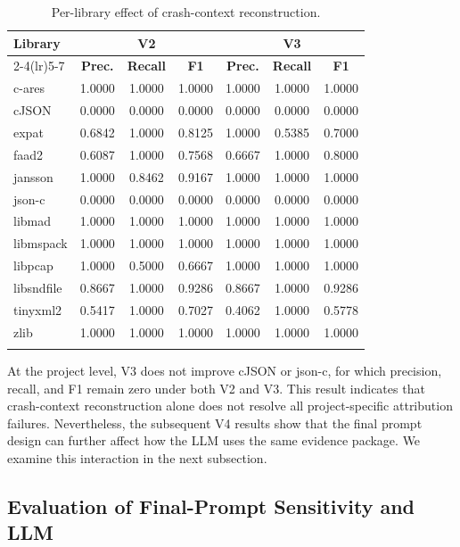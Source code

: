 \documentclass[pdflatex,sn-basic]{sn-jnl}%
\renewcommand{\arraystretch}{1.16}%
\theoremstyle{thmstyleone}%
\theoremstyle{thmstyletwo}%
\theoremstyle{thmstylethree}%
\begin{document}
\begin{table}[!htbp]
\caption{Per-library effect of crash-context reconstruction.}
\label{tab:per-library-context-reconstruction}
\centering
\scriptsize
\setlength{\tabcolsep}{2.2pt}
\renewcommand{\arraystretch}{1.08}
\begin{tabular*}{\linewidth}{@{\extracolsep{\fill}}lcccccc}
\toprule
\textbf{Library} & \multicolumn{3}{c}{\textbf{V2}} & \multicolumn{3}{c}{\textbf{V3}} \\
\cmidrule(lr){2-4}\cmidrule(lr){5-7}
& \textbf{Prec.} & \textbf{Recall} & \textbf{F1} & \textbf{Prec.} & \textbf{Recall} & \textbf{F1} \\
\midrule
c-ares & 1.0000 & 1.0000 & 1.0000 & 1.0000 & 1.0000 & 1.0000 \\
cJSON & 0.0000 & 0.0000 & 0.0000 & 0.0000 & 0.0000 & 0.0000 \\
expat & 0.6842 & 1.0000 & 0.8125 & 1.0000 & 0.5385 & 0.7000 \\
faad2 & 0.6087 & 1.0000 & 0.7568 & 0.6667 & 1.0000 & 0.8000 \\
jansson & 1.0000 & 0.8462 & 0.9167 & 1.0000 & 1.0000 & 1.0000 \\
json-c & 0.0000 & 0.0000 & 0.0000 & 0.0000 & 0.0000 & 0.0000 \\
libmad & 1.0000 & 1.0000 & 1.0000 & 1.0000 & 1.0000 & 1.0000 \\
libmspack & 1.0000 & 1.0000 & 1.0000 & 1.0000 & 1.0000 & 1.0000 \\
libpcap & 1.0000 & 0.5000 & 0.6667 & 1.0000 & 1.0000 & 1.0000 \\
libsndfile & 0.8667 & 1.0000 & 0.9286 & 0.8667 & 1.0000 & 0.9286 \\
tinyxml2 & 0.5417 & 1.0000 & 0.7027 & 0.4062 & 1.0000 & 0.5778 \\
zlib & 1.0000 & 1.0000 & 1.0000 & 1.0000 & 1.0000 & 1.0000 \\
\botrule
\end{tabular*}
\end{table}
At the project level, V3 does not improve cJSON or json-c, for which precision, recall, and F1 remain zero under both V2 and V3. This result indicates that crash-context reconstruction alone does not resolve all project-specific attribution failures. Nevertheless, the subsequent V4 results show that the final prompt design can further affect how the LLM uses the same evidence package. We examine this interaction in the next subsection.
\FloatBarrier
\subsection{Evaluation of Final-Prompt Sensitivity and LLM}
\label{subsec:rq4-sensitivity}
\end{document}

